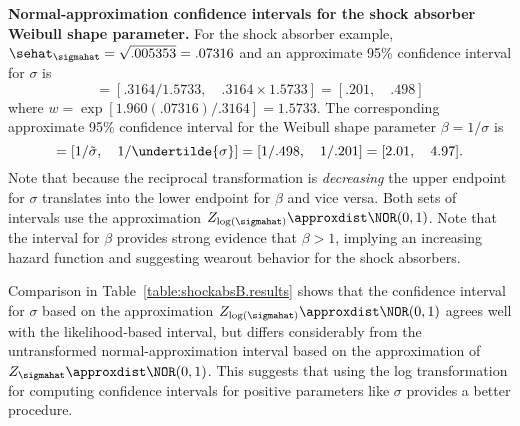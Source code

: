 \begin{example}
{\bf Normal-approximation confidence intervals
for the shock absorber Weibull shape parameter.}
\label{example:normal.theory.ci.for.shock.sigma}
For the shock absorber example, 
$\sehat_{\sigmahat}=\sqrt{.005353}=.07316$
and an approximate  95\% confidence
interval for $\sigma$ is
\begin{displaymath}
[ \undertilde{\sigma}, \quad \tilde{\sigma}] =
[.3164/1.5733, \quad
.3164 \times 1.5733]  = [ .201    , \quad  .498  ]
\end{displaymath}
where $w=\exp[1.960(.07316)/.3164]=1.5733$.
The corresponding approximate  95\% confidence
interval for the Weibull shape parameter $\beta=1/\sigma$ is 
\begin{displaymath}
[ \undertilde{\beta}, \quad \tilde{\beta}]=
[ 1/\tilde{\sigma}, \quad 1/\undertilde{\sigma}]
 = [ 1/.498   , \quad   1/.201   ]
 = [  2.01   , \quad  4.97   ].
\end{displaymath}
Note that because the reciprocal transformation is {\em decreasing}
the upper endpoint for $\sigma$ translates into the lower endpoint for
$\beta$ and vice versa. Both sets of intervals use the approximation
$Z_{\log(\sigmahat)} \approxdist \NOR(0,1)$.  Note that the interval
for $\beta$ provides strong evidence that $\beta > 1$, implying an
increasing hazard function and suggesting wearout behavior for the
shock absorbers.


Comparison in Table~\ref{table:shockabsB.results} shows that the
confidence interval for $\sigma$ based on the approximation
$Z_{\log(\sigmahat)} \approxdist \NOR(0,1)$ agrees well with the
likelihood-based interval, but differs considerably from the
untransformed normal-approximation interval based on the approximation of
$Z_{\sigmahat} \approxdist \NOR(0,1)$. This suggests that
using the log transformation for computing confidence intervals
for positive parameters like $\sigma$ provides a better procedure.
\end{example}
